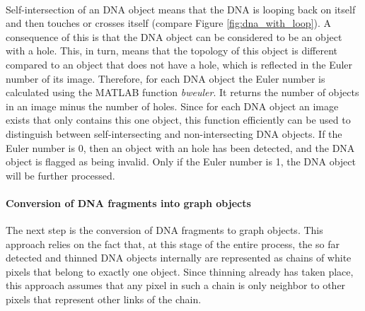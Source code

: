 \documentclass{article}
\begin{document}
\\Self-intersection of an DNA object means that the DNA is looping back on itself and then touches or crosses itself (compare Figure \ref{fig:dna_with_loop}). A consequence of this is that the DNA object can be considered to be an object with a hole. This, in turn, means that the topology of this object is different compared to an object that does not have a hole, which is reflected in the Euler number of its image. Therefore, for each DNA object the Euler number is calculated using the MATLAB function \textit{bweuler}. It returns the number of objects in an image minus the number of holes. Since for each DNA object an image exists that only contains this one object, this function efficiently can be used to distinguish between self-intersecting and non-intersecting DNA objects. If the Euler number is 0, then an object with an hole has been detected, and the DNA object is flagged as being invalid. Only if the Euler number is 1, the DNA object will be further processed.\\

\paragraph{Conversion of DNA fragments into graph objects}
The next step is the conversion of DNA fragments to graph objects. This approach relies on the fact that, at this stage of the entire process, the so far detected and thinned DNA objects internally are represented as chains of white pixels that belong to exactly one object. Since thinning already has taken place, this approach assumes that any pixel in such a chain is only neighbor to other pixels that represent other links of the chain.\\
\end{document}
